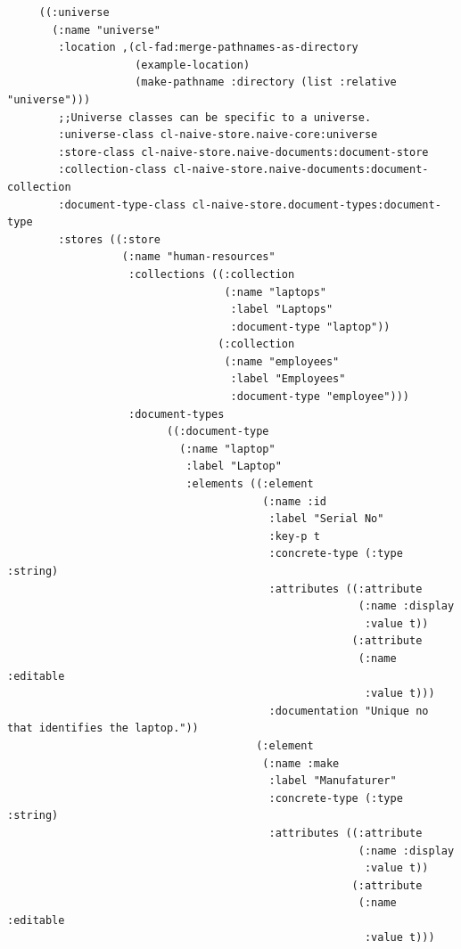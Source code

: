 \documentclass[11pt]{article}
\begin{document}
\begin{verbatim}
     ((:universe
       (:name "universe"
        :location ,(cl-fad:merge-pathnames-as-directory
                    (example-location)
                    (make-pathname :directory (list :relative "universe")))
        ;;Universe classes can be specific to a universe.
        :universe-class cl-naive-store.naive-core:universe
        :store-class cl-naive-store.naive-documents:document-store
        :collection-class cl-naive-store.naive-documents:document-collection
        :document-type-class cl-naive-store.document-types:document-type
        :stores ((:store
                  (:name "human-resources"
                   :collections ((:collection
                                  (:name "laptops"
                                   :label "Laptops"
                                   :document-type "laptop"))
                                 (:collection
                                  (:name "employees"
                                   :label "Employees"
                                   :document-type "employee")))
                   :document-types
                         ((:document-type
                           (:name "laptop"
                            :label "Laptop"
                            :elements ((:element
                                        (:name :id
                                         :label "Serial No"
                                         :key-p t
                                         :concrete-type (:type :string)
                                         :attributes ((:attribute
                                                       (:name :display
                                                        :value t))
                                                      (:attribute
                                                       (:name :editable
                                                        :value t)))
                                         :documentation "Unique no that identifies the laptop."))
                                       (:element
                                        (:name :make
                                         :label "Manufaturer"
                                         :concrete-type (:type :string)
                                         :attributes ((:attribute
                                                       (:name :display
                                                        :value t))
                                                      (:attribute
                                                       (:name :editable
                                                        :value t)))

\end{verbatim}
\end{document}

